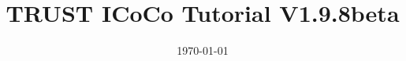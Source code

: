 \documentclass[10pt, hyperref={unicode=true,pdfusetitle, bookmarks=true,bookmarksnumbered=false,bookmarksopen=false, breaklinks=false,pdfborder={0 0 1},backref=true,colorlinks=true,linkcolor=darkblue,pageanchor, urlcolor=darkblue}]{beamer}
\title[TRUST ICoCo Tutorial V1.9.8beta]{TRUST ICoCo Tutorial V1.9.8beta}
\institute[CEA/DES/ISAS/DM2S] %
{
CEA Saclay \\ %
\medskip
\textit{Support team: trust@cea.fr} %
\medskip
}
\date{\today} %
\begin{document}
\begin{frame}
\titlepage %
\end{frame}

\begin{frame}
\tableofcontents [hideallsubsections]
\end{frame}
\end{document}
